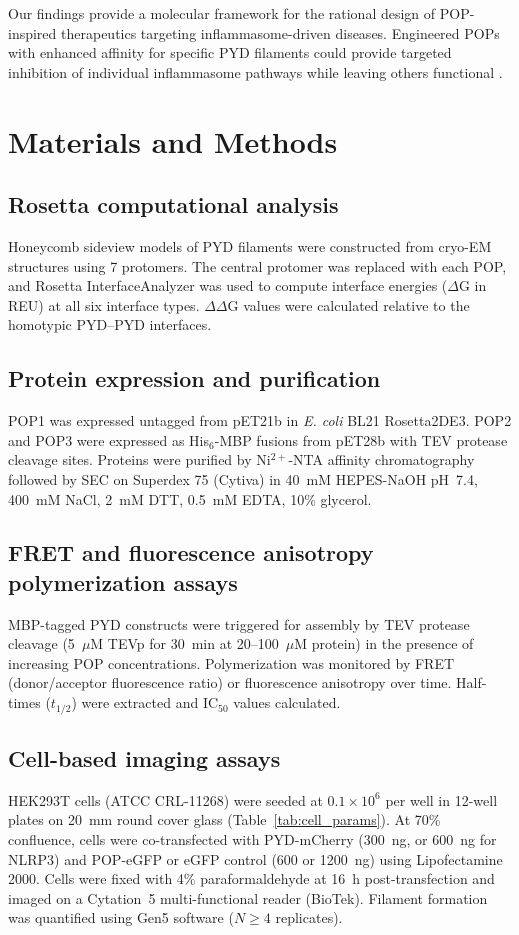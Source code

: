 \documentclass[11pt,a4paper]{article}
\begin{document}
Our findings provide a molecular framework for the rational design of POP-inspired therapeutics targeting inflammasome-driven diseases. Engineered POPs with enhanced affinity for specific PYD filaments could provide targeted inhibition of individual inflammasome pathways while leaving others functional \citep{Swanson2019, Dinarello2018}.

\section{Materials and Methods}

\subsection{Rosetta computational analysis}
Honeycomb sideview models of PYD filaments were constructed from cryo-EM structures using 7 protomers. The central protomer was replaced with each POP, and Rosetta InterfaceAnalyzer was used to compute interface energies ($\Delta$G in REU) at all six interface types. $\Delta\Delta$G values were calculated relative to the homotypic PYD--PYD interfaces.

\subsection{Protein expression and purification}
POP1 was expressed untagged from pET21b in \textit{E. coli} BL21 Rosetta2DE3. POP2 and POP3 were expressed as His$_6$-MBP fusions from pET28b with TEV protease cleavage sites. Proteins were purified by Ni$^{2+}$-NTA affinity chromatography followed by SEC on Superdex 75 (Cytiva) in 40~mM HEPES-NaOH pH~7.4, 400~mM NaCl, 2~mM DTT, 0.5~mM EDTA, 10\% glycerol.

\subsection{FRET and fluorescence anisotropy polymerization assays}
MBP-tagged PYD constructs were triggered for assembly by TEV protease cleavage (5~$\mu$M TEVp for 30~min at 20--100~$\mu$M protein) in the presence of increasing POP concentrations. Polymerization was monitored by FRET (donor/acceptor fluorescence ratio) or fluorescence anisotropy over time. Half-times ($t_{1/2}$) were extracted and IC$_{50}$ values calculated.

\subsection{Cell-based imaging assays}
HEK293T cells (ATCC CRL-11268) were seeded at $0.1 \times 10^6$ per well in 12-well plates on 20~mm round cover glass (Table~\ref{tab:cell_params}). At 70\% confluence, cells were co-transfected with PYD-mCherry (300~ng, or 600~ng for NLRP3) and POP-eGFP or eGFP control (600 or 1200~ng) using Lipofectamine 2000. Cells were fixed with 4\% paraformaldehyde at 16~h post-transfection and imaged on a Cytation~5 multi-functional reader (BioTek). Filament formation was quantified using Gen5 software ($N \geq 4$ replicates).
\end{document}
